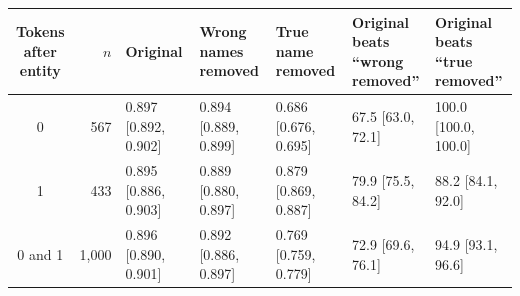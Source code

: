 \begin{tabular}{@{}crlllll@{}}
\toprule
\shortstack[l]{Tokens after\\entity} & $n$ & Original & \shortstack[l]{Wrong names\\removed} & \shortstack[l]{True name\\removed} & \shortstack[l]{Original beats\\``wrong\\removed''} & \shortstack[l]{Original beats\\``true\\removed''} \\
\midrule
0 & 567 & 0.897 {\scriptsize[0.892, 0.902]} & 0.894 {\scriptsize[0.889, 0.899]} & 0.686 {\scriptsize[0.676, 0.695]} & 67.5 {\scriptsize[63.0, 72.1]} & 100.0 {\scriptsize[100.0, 100.0]} \\
1 & 433 & 0.895 {\scriptsize[0.886, 0.903]} & 0.889 {\scriptsize[0.880, 0.897]} & 0.879 {\scriptsize[0.869, 0.887]} & 79.9 {\scriptsize[75.5, 84.2]} & 88.2 {\scriptsize[84.1, 92.0]} \\
0 and 1 & 1{,}000 & 0.896 {\scriptsize[0.890, 0.901]} & 0.892 {\scriptsize[0.886, 0.897]} & 0.769 {\scriptsize[0.759, 0.779]} & 72.9 {\scriptsize[69.6, 76.1]} & 94.9 {\scriptsize[93.1, 96.6]} \\
\bottomrule
\end{tabular}
